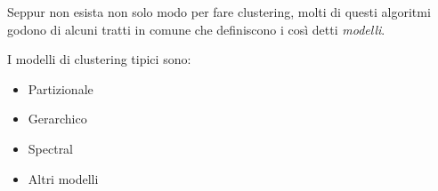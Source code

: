 	Seppur non esista non solo modo per fare clustering, molti di questi algoritmi godono di alcuni tratti in comune che definiscono i così detti \emph{modelli}.

	I modelli di clustering tipici sono:
	\begin{itemize}
		\item Partizionale
		\item Gerarchico
		\item Spectral
		\item Altri modelli
	\end{itemize}

	
	
	
	
%	
%	
